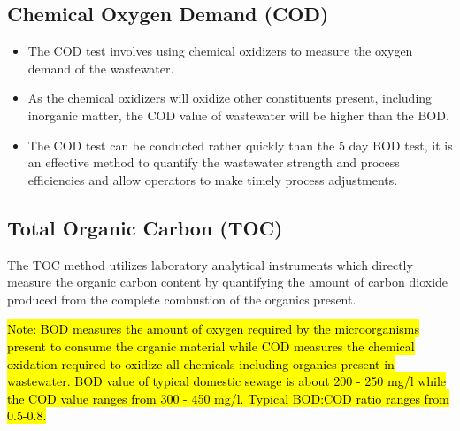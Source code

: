\begin{itemize}
			    \subsection{Chemical Oxygen Demand (COD)}
			      	\begin{itemize}
			      		\item The COD test involves using chemical oxidizers to measure the oxygen demand of the wastewater.
			      		\item As the chemical oxidizers will oxidize other constituents present, including inorganic matter, the COD value of wastewater will be higher than the BOD.  
			      		\item The COD test can be conducted rather quickly than the 5 day BOD test, it is an effective method to quantify the wastewater strength and process efficiencies and allow operators to make timely process adjustments.
			      	\end{itemize}

			    \subsection{Total Organic Carbon (TOC)}
			      	The TOC method utilizes laboratory analytical instruments which directly measure the organic carbon content by quantifying the amount of carbon dioxide produced from the complete combustion of the organics present.
		\end{itemize}
		
		
		
			\hl{Note: BOD measures the amount of oxygen required by the microorganisms present to consume the organic material while COD measures the chemical oxidation required to oxidize all chemicals including organics present in wastewater.  BOD value of typical domestic sewage is about 200 - 250 mg/l while the COD value ranges from 300 - 450 mg/l.  Typical BOD:COD ratio ranges from 0.5-0.8.}\\


